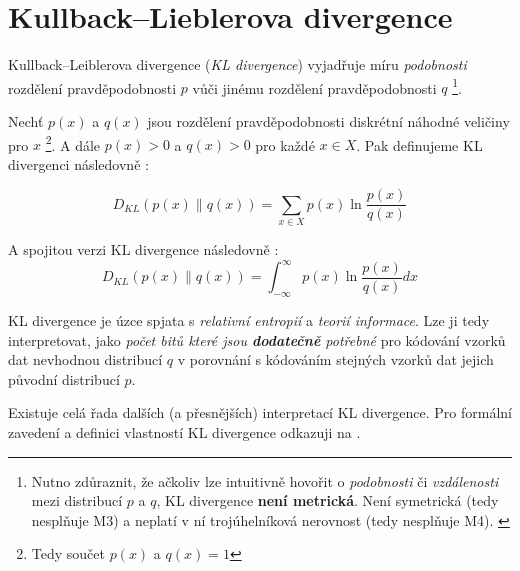 \section{Kullback–Lieblerova divergence}
\label{sec:kl_divergence}

Kullback–Leiblerova divergence (\emph{KL divergence}) vyjadřuje míru \emph{podobnosti} rozdělení pravděpodobnosti $p$ vůči jinému rozdělení pravděpodobnosti $q$
\footnote{Nutno zdůraznit, že ačkoliv lze intuitivně hovořit o \emph{podobnosti} či \emph{vzdálenosti} mezi distribucí $p$ a $q$, KL divergence \textbf{není metrická}. Není symetrická (tedy nesplňuje M3) a neplatí v ní trojúhelníková nerovnost (tedy nesplňuje M4). \cite{Phillips2021}}.


Nechť $p(x)$ a $q(x)$ jsou rozdělení pravděpodobnosti diskrétní náhodné veličiny pro $x$
\footnote{Tedy součet $p(x)$ a $q(x) = 1$}.
A dále $p(x) > 0$ a $q(x) > 0$ pro každé $x \in X$. Pak definujeme KL divergenci následovně \cite{Murphy2022}:

\begin{equation}
    D_{KL}(p(x) \| q(x)) = \sum_{x \in X}^{}p(x)\ln{\frac{p(x)}{q(x)}}
\end{equation}

A spojitou verzi KL divergence následovně \cite{Murphy2022}:
\begin{equation}
    D_{KL}(p(x) \| q(x)) = \int_{-\infty}^{\infty}p(x)\ln{\frac{p(x)}{q(x)}}dx 
\end{equation}

KL divergence je úzce spjata s \emph{relativní entropií} a \emph{teorií informace}.
Lze ji tedy interpretovat, jako \emph{počet bitů které jsou \textbf{dodatečně} potřebné} pro kódování vzorků dat nevhodnou distribucí $q$ v porovnání s kódováním stejných vzorků dat jejich původní distribucí $p$.

Existuje celá řada dalších (a přesnějších) interpretací KL divergence. Pro formální zavedení a definici vlastností KL divergence odkazuji na \cite[kap. 5.1]{Murphy2023}.
